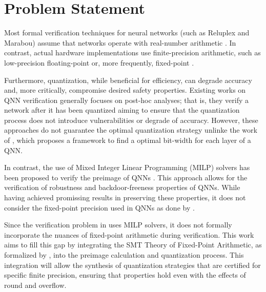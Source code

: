 \section{Problem Statement}\label{sec:problem_statement}

Most formal verification techniques for neural networks (such as Reluplex and Marabou) assume that networks operate with real-number arithmetic \cite{katz2017reluplex,amir2021smt}. In contrast, actual hardware implementations use finite-precision arithmetic, such as low-precision floating-point or, more frequently, fixed-point \cite{han2020understanding}.

Furthermore, quantization, while beneficial for efficiency, can degrade accuracy and, more critically, compromise desired safety properties. Existing works on QNN verification generally focuses on post-hoc analyses; that is, they verify a network after it has been quantized \cite{eleftheriadis2022neuralnetworkequivalencechecking,song2023qnnrepair,katz2017reluplex,baranowski2020smt, Pulina2012Challenging, cordeiro2025neuralnetworkverificationprogramming} aiming to ensure that the quantization process does not introduce vulnerabilities or degrade of accuracy. However, these approaches do not guarantee the optimal quantization strategy unlinke the work of \cite{abdi2021counterexample,cai2025certified}, which proposes a framework to find a optimal bit-width for each layer of a QNN.

In contrast, the use of Mixed Integer Linear Programming (MILP) solvers has been proposed to verify the preimage of QNNs \cite{cai2025certified}. This approach allows for the verification of robustness and backdoor-freeness properties of QNNs. While having achieved promissing results in preserving these properties, it does not consider the fixed-point precision used in QNNs as done by \cite{baranowski2020smt}.

Since the verification problem in \cite{cai2025certified} uses MILP solvers, it does not formally incorporate the nuances of fixed-point arithmetic during verification. This work aims to fill this gap by integrating the SMT Theory of Fixed-Point Arithmetic, as formalized by \cite{baranowski2020smt}, into the preimage calculation and quantization process. This integration will allow the synthesis of quantization strategies that are certified for specific finite precision, ensuring that properties hold even with the effects of round and overflow.

